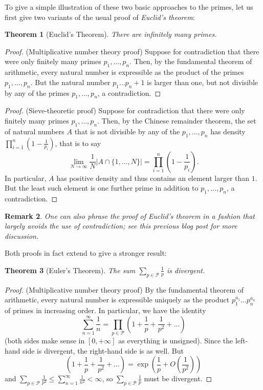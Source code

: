 \documentclass[10pt,reqno]{amsart}
\newtheorem{theorem}{Theorem}
\newtheorem{remark}[theorem]{Remark}
\begin{document}
To give a simple illustration of these two basic approaches to the primes, let us first give two variants of the usual proof of \emph{Euclid’s theorem}:
%
\begin{theorem}[Euclid's Theorem]
    There are infinitely many primes.
\end{theorem}
\begin{proof}
    (Multiplicative number theory proof) Suppose for contradiction that there were only finitely many primes $p_1,\dots,p_n$. Then, by the fundamental theorem of arithmetic, every natural number is expressible as the product of the primes $p_1,\dots,p_n$. But the natural number $p_1 \dots p_n + 1$ is larger than one, but not divisible by any of the primes $p_1,\dots,p_n$, a contradiction.
\end{proof}

\begin{proof}
    (Sieve-theoretic proof) Suppose for contradiction that there were only finitely many primes $p_1,\dots,p_n$. Then, by the Chinese remainder theorem, the set of natural numbers $A$ that is not divisible by any of the $p_1,\dots,p_n$ has density $\prod_{i=1}^n (1-\frac{1}{p_i})$, that is to say
    \[ \lim_{N \rightarrow \infty} \frac{1}{N} | A \cap \{1,\dots,N\} | = \prod_{i=1}^n (1-\frac{1}{p_i}). \]
    In particular, $A$ has positive density and thus contains an element larger than $1$. But the least such element is one further prime in addition to $p_1,\dots,p_n$, a contradiction.
\end{proof}

\begin{remark}
    One can also phrase the proof of Euclid’s theorem in a fashion that largely avoids the use of contradiction; see this previous blog post for more discussion.
\end{remark}

Both proofs in fact extend to give a stronger result:

\begin{theorem}[Euler's Theorem]
    The sum $\sum_{p \in {\mathcal P}} \frac{1}{p}$ is divergent.
\end{theorem}
\begin{proof}
    (Multiplicative number theory proof) By the fundamental theorem of arithmetic, every natural number is expressible uniquely as the product $p_1^{a_1} \dots p_n^{a_n}$ of primes in increasing order. In particular, we have the identity
    \[ \sum_{n=1}^\infty \frac{1}{n} = \prod_{p \in {\mathcal P}} ( 1 + \frac{1}{p} + \frac{1}{p^2} + \dots ) \]
    (both sides make sense in $[0,+\infty]$ as everything is unsigned). Since the left-hand side is divergent, the right-hand side is as well. But
    \[ ( 1 + \frac{1}{p} + \frac{1}{p^2} + \dots ) = \exp( \frac{1}{p} + O( \frac{1}{p^2} ) ) \]
    and $\sum_{p \in {\mathcal P}} \frac{1}{p^2}\leq \sum_{n=1}^\infty \frac{1}{n^2} < \infty$, so $\sum_{p \in {\mathcal P}} \frac{1}{p}$ must be divergent.
\end{proof}
\end{document}
